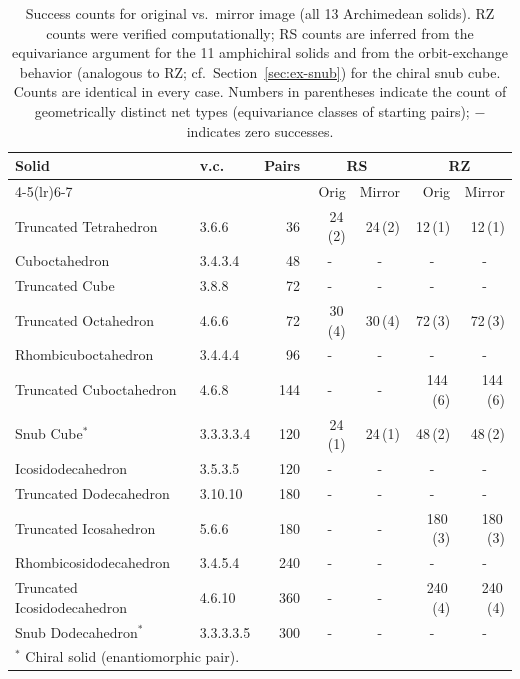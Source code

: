 \documentclass[12pt]{article}
\theoremstyle{definition}
\begin{document}
\begin{table}[ht]
\centering
\caption{Success counts for original vs.\ mirror image (all 13 Archimedean
  solids).  RZ counts were verified computationally;
  RS counts are inferred from the equivariance argument for the
  11 amphichiral solids and from the orbit-exchange behavior
  (analogous to RZ; cf.\ Section~\ref{sec:ex-snub})
  for the chiral snub cube.
  Counts are identical in every case.
  Numbers in parentheses indicate the count of geometrically distinct
  net types (equivariance classes of starting pairs);
  $-$ indicates zero successes.}
\label{tab:mirror}
\small
\setlength{\tabcolsep}{5pt}
\begin{tabular}{llrrrrr}
\toprule
Solid & v.c. & Pairs & \multicolumn{2}{c}{RS} & \multicolumn{2}{c}{RZ} \\
\cmidrule(lr){4-5}\cmidrule(lr){6-7}
 & & & Orig & Mirror & Orig & Mirror \\
\midrule
Truncated Tetrahedron       & 3.6.6       &  36 & 24\,(2) & 24\,(2) & 12\,(1) & 12\,(1) \\
Cuboctahedron               & 3.4.3.4     &  48 & \multicolumn{1}{c}{-} & \multicolumn{1}{c}{-} & \multicolumn{1}{c}{-} & \multicolumn{1}{c}{-} \\
Truncated Cube              & 3.8.8       &  72 & \multicolumn{1}{c}{-} & \multicolumn{1}{c}{-} & \multicolumn{1}{c}{-} & \multicolumn{1}{c}{-} \\
Truncated Octahedron        & 4.6.6       &  72 & 30\,(4) & 30\,(4) & 72\,(3) & 72\,(3) \\
Rhombicuboctahedron         & 3.4.4.4     &  96 & \multicolumn{1}{c}{-} & \multicolumn{1}{c}{-} & \multicolumn{1}{c}{-} & \multicolumn{1}{c}{-} \\
Truncated Cuboctahedron     & 4.6.8       & 144 & \multicolumn{1}{c}{-} & \multicolumn{1}{c}{-} &144\,(6) &144\,(6) \\
Snub Cube$^*$               & 3.3.3.3.4   & 120 & 24\,(1) & 24\,(1) & 48\,(2) & 48\,(2) \\
Icosidodecahedron           & 3.5.3.5     & 120 & \multicolumn{1}{c}{-} & \multicolumn{1}{c}{-} & \multicolumn{1}{c}{-} & \multicolumn{1}{c}{-} \\
Truncated Dodecahedron      & 3.10.10     & 180 & \multicolumn{1}{c}{-} & \multicolumn{1}{c}{-} & \multicolumn{1}{c}{-} & \multicolumn{1}{c}{-} \\
Truncated Icosahedron       & 5.6.6       & 180 & \multicolumn{1}{c}{-} & \multicolumn{1}{c}{-} &180\,(3) &180\,(3) \\
Rhombicosidodecahedron      & 3.4.5.4     & 240 & \multicolumn{1}{c}{-} & \multicolumn{1}{c}{-} & \multicolumn{1}{c}{-} & \multicolumn{1}{c}{-} \\
Truncated Icosidodecahedron & 4.6.10      & 360 & \multicolumn{1}{c}{-} & \multicolumn{1}{c}{-} &240\,(4) &240\,(4) \\
Snub Dodecahedron$^*$       & 3.3.3.3.5   & 300 & \multicolumn{1}{c}{-} & \multicolumn{1}{c}{-} & \multicolumn{1}{c}{-} & \multicolumn{1}{c}{-} \\
\bottomrule
\multicolumn{7}{l}{\small$^*$ Chiral solid (enantiomorphic pair).}
\end{tabular}
\end{table}
\end{document}
